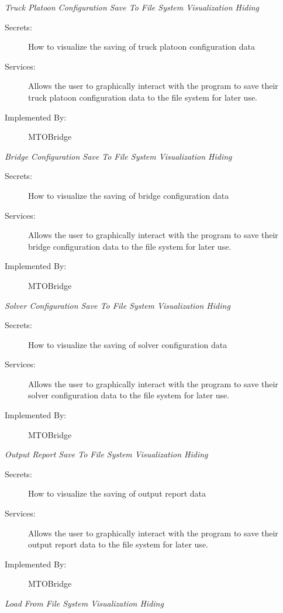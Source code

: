 \documentclass[12pt, titlepage]{article}
\begin{document}
    \emph{{\large Truck Platoon Configuration Save To File System Visualization Hiding}}
    \begin{description}
        \item[Secrets:]How to visualize the saving of truck platoon configuration data
        \item[Services:]Allows the user to graphically interact with the program to save their truck platoon configuration data to the file system for later use.
        \item[Implemented By:] MTOBridge\\
    \end{description}
    \emph{{\large Bridge Configuration Save To File System Visualization Hiding}}
    \begin{description}
        \item[Secrets:]How to visualize the saving of bridge configuration data
        \item[Services:]Allows the user to graphically interact with the program to save their bridge configuration data to the file system for later use.
        \item[Implemented By:] MTOBridge\\
    \end{description}
    \emph{{\large Solver Configuration Save To File System Visualization Hiding}}
    \begin{description}
        \item[Secrets:]How to visualize the saving of solver configuration data
        \item[Services:]Allows the user to graphically interact with the program to save their solver configuration data to the file system for later use.
        \item[Implemented By:] MTOBridge\\
    \end{description}
    \emph{{\large Output Report Save To File System Visualization Hiding}}
    \begin{description}
        \item[Secrets:]How to visualize the saving of output report data
        \item[Services:]Allows the user to graphically interact with the program to save their output report data to the file system for later use.
        \item[Implemented By:] MTOBridge\\
    \end{description}
    \emph{{\large Load From File System Visualization Hiding}}
\end{document}
